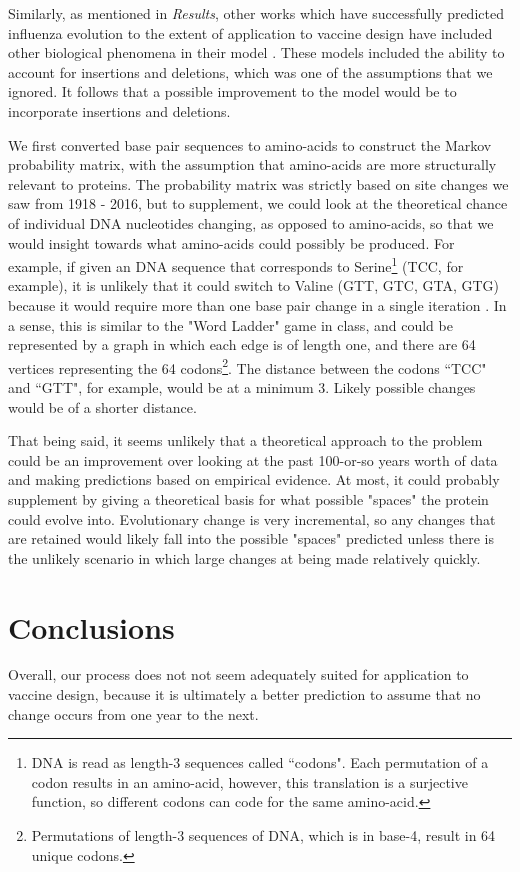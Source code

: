 \documentclass[12pt]{article}
\begin{document}
\begin{multicols}{2}
Similarly, as mentioned in \textit{Results}, other works which have successfully predicted influenza evolution to the extent of application to vaccine design have included other biological phenomena in their model \citep{luksza2014predictive}. These models included the ability to account for insertions and deletions, which was one of the assumptions that we ignored. It follows that a possible improvement to the model would be to incorporate insertions and deletions.

We first converted base pair sequences to amino-acids to construct the Markov probability matrix, with the assumption that amino-acids are more structurally relevant to proteins. The probability matrix was strictly based on site changes we saw from 1918 - 2016, but to supplement, we could look at the theoretical chance of individual DNA nucleotides changing, as opposed to amino-acids, so that we would insight towards what amino-acids could possibly be produced. For example, if given an DNA sequence that corresponds to Serine\footnote{DNA is read as length-3 sequences called ``codons". Each permutation of a codon results in an amino-acid, however, this translation is a surjective function, so different codons can code for the same amino-acid.} (TCC, for example), it is unlikely that it could switch to Valine (GTT, GTC, GTA, GTG) because it would require more than one base pair change in a single iteration \citep{brendel1986linguistics}. In a sense, this is similar to the "Word Ladder" game in class, and could be represented by a graph in which each edge is of length one, and there are 64 vertices representing the 64 codons\footnote{Permutations of length-3 sequences of DNA, which is in base-4, result in 64 unique codons.}. The distance between the codons ``TCC" and ``GTT", for example, would be at a minimum 3. Likely possible changes would be of a shorter distance. 

That being said, it seems unlikely that a theoretical approach to the problem could be an improvement over looking at the past 100-or-so years worth of data and making predictions based on empirical evidence. At most, it could probably supplement by giving a theoretical basis for what possible "spaces" the protein could evolve into. Evolutionary change is very incremental, so any changes that are retained would likely fall into the possible "spaces" predicted unless there is the unlikely scenario in which large changes at being made relatively quickly.  

\section{Conclusions}
Overall, our process does not not seem adequately suited for application to vaccine design, because it is ultimately a better prediction to assume that no change occurs from one year to the next.


\end{multicols}
\end{document}
